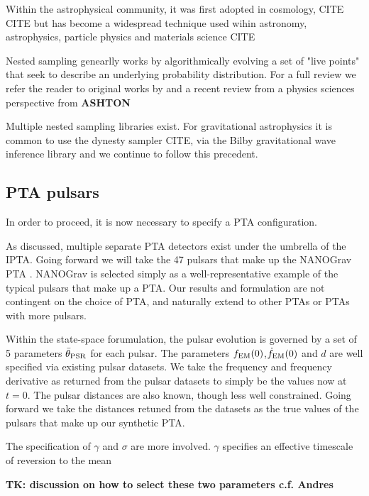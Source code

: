 \documentclass[fleqn,usenatbib,useAMS]{mnras}
\begin{document}
 
Within the astrophysical community, it was first adopted in cosmology, CITE CITE but has become a widespread technique used wihin astronomy, astrophysics, particle physics and materials science CITE 


Nested sampling genearlly works by algorithmically evolving a set of "live points" that seek to describe an underlying probability distribution. For a full review we refer the reader to original works by \cite{Skilling} and a recent review from a physics sciences perspective from \textbf{ASHTON}




Multiple nested sampling libraries exist. For gravitational astrophysics it is common to use the dynesty sampler CITE, via the Bilby gravitational wave inference library and we continue to follow this precedent. 



\subsection{PTA pulsars}

In order to proceed, it is now necessary to specify a PTA configuration. 


As discussed, multiple separate PTA detectors exist under the umbrella of the IPTA. Going forward we will take the 47 pulsars that make up the NANOGrav PTA \citep{2020ApJ...905L..34A}. NANOGrav is selected simply as a well-representative example of the typical pulsars that make up a PTA. Our results and formulation are not contingent on the choice of PTA, and naturally extend to other PTAs or PTAs with more pulsars.  



Within the state-space forumulation, the pulsar evolution is governed by a set of 5 parameters $\bar{\theta}_{\rm PSR}$ for each pulsar. The parameters $f_{\rm EM} (0) $,$ \dot{f}_{\rm EM} (0)$ and $d$ are well specified via existing pulsar datasets. We take the frequency and frequency derivative as returned from the pulsar datasets to simply be the values now at $t=0$. The pulsar distances are also known, though less well constrained. Going forward we take the distances retuned from the datasets as the true values of the pulsars that make up our synthetic PTA. 



The specification of $\gamma$ and $\sigma$ are more involved. $\gamma$ specifies an effective timescale of reversion to the mean


\textbf{TK: discussion on how to select these two parameters c.f. Andres }
\end{document}
